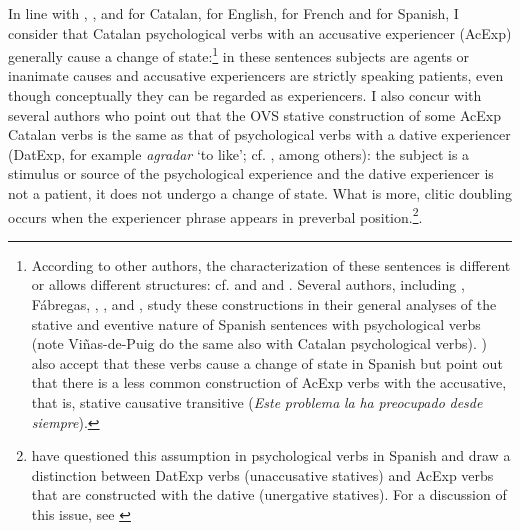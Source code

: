 \documentclass[output=paper,modfonts,nonflat,newtxmath]{langsci/langscibook}
\begin{document}
In line with \citet{Ynglès1991}, \citet{CabreMateu1998}, \citet{Rossello2008} and \citet[Section 21.5]{GIEC2016} for Catalan, \citet{Pesetsky1995} for English, \citet{Bouchard1995} for French and \citet{Acedo-MatellánMateu2015} for Spanish, I consider that Catalan psychological verbs with an accusative experiencer (AcExp) generally cause a change of state:\footnote{According to other authors, the characterization of these sentences is different or allows different structures: cf. \citet{Voorst1992, Arad1999, Landau2010} and \citet{MarinMcNally2011} and \citet{Fabregas2015}. Several authors, including \citet{FabregasMarín2012}, Fábregas, \citet{FabregasEtAl2012}, \citet{MarinSanchezMarco2012} \citet{Marco2012}, \citet{Ganeshan2014} and \citet{Viñas-de-Puig2014}, study these constructions in their general analyses of the stative and eventive nature of Spanish sentences with psychological verbs (note Viñas-de-Puig do the same also with Catalan psychological verbs). \citet[83]{Acedo-MatellánMateu2015} ) also accept that these verbs cause a change of state in Spanish but point out that there is a less common construction of AcExp verbs with the accusative, that is, stative causative transitive (\textit{Este} \textit{problema} \textit{la} \textit{ha} \textit{preocupado} \textit{desde} \textit{siempre}).} in these sentences subjects are agents or inanimate causes and accusative experiencers are strictly speaking patients, even though conceptually they can be regarded as experiencers. I also concur with several authors who point out that the OVS stative construction of some AcExp Catalan verbs is the same as that of psychological verbs with a dative experiencer (DatExp, for example \textit{agradar} ‘to like’; cf. \citealt{CabreMateu1998, Ramos2004, Rossello2008, Cuervo2010Cuestiones}, among others): the subject is a stimulus or source of the psychological experience and the dative experiencer is not a patient, it does not undergo a change of state. What is more, clitic doubling occurs when the experiencer phrase appears in preverbal position.\footnote{\citet{Acedo-MatellánMateu2015} have questioned this assumption in psychological verbs in Spanish and draw a distinction between DatExp verbs (unaccusative statives) and AcExp verbs that are constructed with the dative (unergative statives). For a discussion of this issue, see \citet[Section 6.2.4.1]{Royo2017}}.
\end{document}
